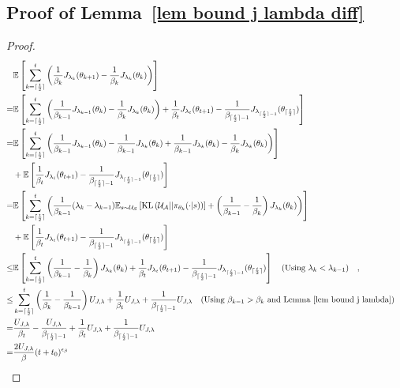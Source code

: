\documentclass[twoside,11pt]{article}
\DeclarePairedDelimiter{\ceil}{\lceil}{\rceil}
\newcommand{\fS}{\mathcal{S}}
\newcommand{\fA}{\mathcal{A}}
\newcommand{\fU}{\mathcal{U}}
\newcommand{\E}{\mathbb{E}}
\newcommand{\kl}[2]{\text{KL}\left(#1||#2\right)}
\numberwithin{assucounter}{section}
\begin{document}
\subsection{Proof of Lemma~\ref{lem bound j lambda diff}}
\label{sec proof lem bound j lambda diff}
\lemboundjlambdadiff*
\begin{proof}
  \begin{align}
    &\E\left[\sum_{k=\ceil{\frac{t}{2}}}^t \left(\frac{1}{\beta_k}J_{\lambda_k}(\theta_{k+1}) - \frac{1}{\beta_k}J_{\lambda_k}(\theta_k) \right) \right]\\
    =& \E\left[\sum_{k=\ceil{\frac{t}{2}}}^t\left(\frac{1}{\beta_{k-1}}J_{\lambda_{k-1}}(\theta_k) - \frac{1}{\beta_k}J_{\lambda_k}(\theta_k) \right) + \frac{1}{\beta_t} J_{\lambda_t}(\theta_{t+1}) - \frac{1}{\beta_{\ceil{\frac{t}{2}}-1}} J_{\lambda_{\ceil{\frac{t}{2}}-1}}(\theta_{\ceil{\frac{t}{2}}}) \right] \\
    =&\E\left[ \sum_{k=\ceil{\frac{t}{2}}}^t\left(\frac{1}{\beta_{k-1}}J_{\lambda_{k-1}}(\theta_{k}) - \frac{1}{\beta_{k-1}} J_{\lambda_k}(\theta_k) + \frac{1}{\beta_{k-1}} J_{\lambda_k}(\theta_k) - \frac{1}{\beta_k}J_{\lambda_k}(\theta_k) \right) \right] \\
    &+ \E\left[\frac{1}{\beta_t} J_{\lambda_t}(\theta_{t+1}) - \frac{1}{\beta_{\ceil{\frac{t}{2}} - 1}} J_{\lambda_{\ceil{\frac{t}{2}}- 1}}(\theta_{\ceil{\frac{t}{2}}}) \right]\\
    =& \E\left[\sum_{k=\ceil{\frac{t}{2}}}^t\left(\frac{1}{\beta_{k-1}}(\lambda_k - \lambda_{k-1}) \E_{s\sim \fU_\fS}\left[\kl{\fU_\fA}{\pi_{\theta_k}(\cdot |s)}\right] + \left(\frac{1}{\beta_{k-1}} - \frac{1}{\beta_k}\right) J_{\lambda_k}(\theta_k) \right) \right]\\
    &+ \E\left[\frac{1}{\beta_t} J_{\lambda_t}(\theta_{t+1}) - \frac{1}{\beta_{\ceil{\frac{t}{2}}-1}} J_{\lambda_{\ceil{\frac{t}{2}} - 1}}(\theta_{\ceil{\frac{t}{2}}}) \right]\\
    \leq &\E\left[ \sum_{k=\ceil{\frac{t}{2}}}^t\left(\frac{1}{\beta_{k-1}} - \frac{1}{\beta_k}\right) J_{\lambda_k}(\theta_k)  + \frac{1}{\beta_t} J_{\lambda_t}(\theta_{t+1}) - \frac{1}{\beta_{\ceil{\frac{t}{2}}-1}} J_{\lambda_{\ceil{\frac{t}{2}} - 1}}(\theta_{\ceil{\frac{t}{2}}}) \right] \qq{(Using $\lambda_k < \lambda_{k-1}$)}, \\
    \leq & \sum_{k=\ceil{\frac{t}{2}}}^t\left(\frac{1}{\beta_k} - \frac{1}{\beta_{k-1}} \right) U_{J, \lambda}  + \frac{1}{\beta_t} U_{J, \lambda} + \frac{1}{\beta_{\ceil{\frac{t}{2}}-1}} U_{J, \lambda} \qq{\hfill (Using $\beta_{k-1} > \beta_k$ and Lemma~\ref{lem bound j lambda})} \\
    = & \frac{U_{J, \lambda}}{\beta_t} - \frac{U_{J, \lambda}}{\beta_{\ceil{\frac{t}{2}}-1}} + \frac{1}{\beta_t} U_{J, \lambda} + \frac{1}{\beta_{\ceil{\frac{t}{2}}-1}} U_{J, \lambda}  \\
    = & \frac{2U_{J, \lambda}}{\beta} (t+t_0)^{\epsilon_\beta}
\end{align}
\end{proof}
\end{document}
